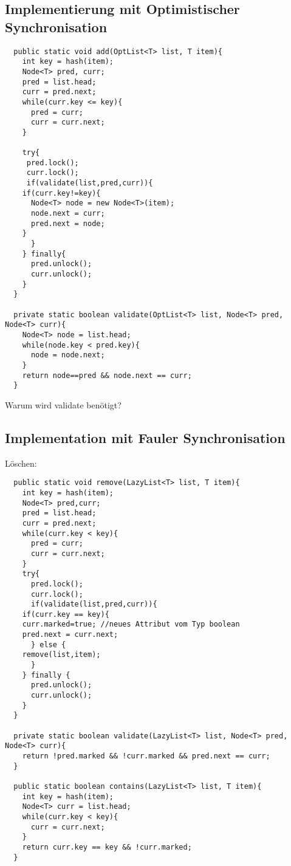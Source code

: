 \documentclass[a4paper,12pt]{scrartcl}
\begin{document}
 \subsection{Implementierung mit Optimistischer Synchronisation}
 
 \begin{lstlisting}
  public static void add(OptList<T> list, T item){
    int key = hash(item);
    Node<T> pred, curr;
    pred = list.head;
    curr = pred.next;
    while(curr.key <= key){
      pred = curr;
      curr = curr.next;
    }
    
    try{
     pred.lock(); 
     curr.lock();
     if(validate(list,pred,curr)){
	if(curr.key!=key){
	  Node<T> node = new Node<T>(item);
	  node.next = curr;
	  pred.next = node;
	}
      }
    } finally{
      pred.unlock();
      curr.unlock();
    }
  }
  
  private static boolean validate(OptList<T> list, Node<T> pred, Node<T> curr){
    Node<T> node = list.head;
    while(node.key < pred.key){
      node = node.next;
    }
    return node==pred && node.next == curr;
  }
 \end{lstlisting}

 Warum wird validate benötigt?
 
 \subsection{Implementation mit Fauler Synchronisation}
 
 Löschen:
 \begin{lstlisting}
  public static void remove(LazyList<T> list, T item){
    int key = hash(item);
    Node<T> pred,curr;
    pred = list.head;
    curr = pred.next;
    while(curr.key < key){
      pred = curr;
      curr = curr.next;
    }
    try{
      pred.lock();
      curr.lock();
      if(validate(list,pred,curr)){
	if(curr.key == key){
	curr.marked=true; //neues Attribut vom Typ boolean
	pred.next = curr.next;
      } else {
	remove(list,item);
      }
    } finally {
      pred.unlock();
      curr.unlock();
    }
  }
  
  private static boolean validate(LazyList<T> list, Node<T> pred, Node<T> curr){
    return !pred.marked && !curr.marked && pred.next == curr;
  }
  
  public static boolean contains(LazyList<T> list, T item){
    int key = hash(item);
    Node<T> curr = list.head;
    while(curr.key < key){
      curr = curr.next;
    }
    return curr.key == key && !curr.marked;
  }
  
 \end{lstlisting}
\end{document}
